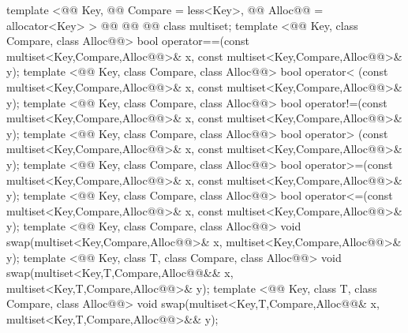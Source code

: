 \documentclass[american,twoside]{book}
\begin{document}
\begin{codeblock}
{  template <@@ Key, @@ Compare = less<Key>,
            @@ Alloc@@ = allocator<Key> >
    @@
             @@
             @@
    class multiset;
  template <@@ Key, class Compare, class Alloc@@>
    bool operator==(const multiset<Key,Compare,Alloc@@>& x,
                    const multiset<Key,Compare,Alloc@@>& y);
  template <@@ Key, class Compare, class Alloc@@>
    bool operator< (const multiset<Key,Compare,Alloc@@>& x,
                    const multiset<Key,Compare,Alloc@@>& y);
  template <@@ Key, class Compare, class Alloc@@>
    bool operator!=(const multiset<Key,Compare,Alloc@@>& x,
                    const multiset<Key,Compare,Alloc@@>& y);
  template <@@ Key, class Compare, class Alloc@@>
    bool operator> (const multiset<Key,Compare,Alloc@@>& x,
                    const multiset<Key,Compare,Alloc@@>& y);
  template <@@ Key, class Compare, class Alloc@@>
    bool operator>=(const multiset<Key,Compare,Alloc@@>& x,
                    const multiset<Key,Compare,Alloc@@>& y);
  template <@@ Key, class Compare, class Alloc@@>
    bool operator<=(const multiset<Key,Compare,Alloc@@>& x,
                    const multiset<Key,Compare,Alloc@@>& y);
  template <@@ Key, class Compare, class Alloc@@>
    void swap(multiset<Key,Compare,Alloc@@>& x,
              multiset<Key,Compare,Alloc@@>& y);
  template <@@ Key, class T, class Compare, class Alloc@@>
    void swap(multiset<Key,T,Compare,Alloc@@&& x,
              multiset<Key,T,Compare,Alloc@@>& y);
  template <@@ Key, class T, class Compare, class Alloc@@>
    void swap(multiset<Key,T,Compare,Alloc@@& x,
              multiset<Key,T,Compare,Alloc@@>&& y);
}
\end{codeblock}
\end{document}
